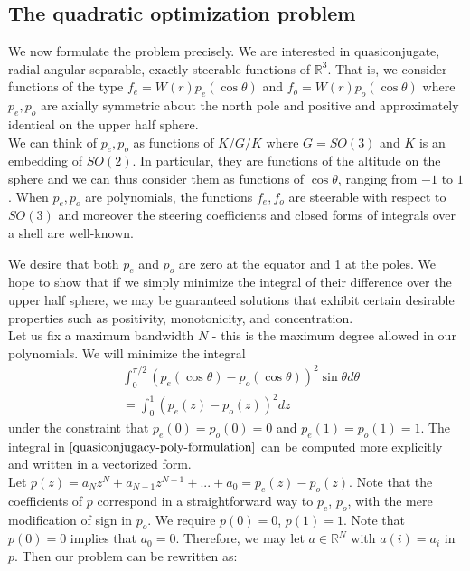 \documentclass{article}
\theoremstyle{definition}
\theoremstyle{remark}
\numberwithin{equation}{section}
\begin{document}
\subsection{The quadratic optimization problem}
\label{problem}

We now formulate the problem precisely. We are interested in quasiconjugate, radial-angular separable, exactly steerable functions of $\mathbb{R}^3$. That is, we consider functions of the type $f_e = W(r)p_e(\cos \theta)$ and $f_o = W(r)p_o(\cos \theta)$ where $p_e, p_o$ are axially symmetric about the north pole and positive and approximately identical on the upper half sphere. \\

We can think of $p_e, p_o$ as functions of $K/G/K$ where $G=SO(3)$ and $K$ is an embedding of $SO(2)$. In particular, they are functions of the altitude on the sphere and we can thus consider them as functions of $\cos \theta$, ranging from $-1$ to $1$. When $p_e, p_o$ are polynomials, the functions $f_e, f_o$ are steerable with respect to $SO(3)$ and moreover the steering coefficients and closed forms of integrals over a shell are well-known. 

We desire that both $p_e$ and $p_o$ are zero at the equator and 1 at the poles. We hope to show that if we simply minimize the integral of their difference over the upper half sphere, we may be guaranteed solutions that exhibit certain desirable properties such as positivity, monotonicity, and concentration. \\

Let us fix a maximum bandwidth $N$ - this is the maximum degree allowed in our polynomials. We will minimize the integral
\begin{align}
&\int_0^{\pi/2} (p_e(\cos\theta) - p_o(\cos\theta))^2 \sin\theta d\theta\\ \label{quasiconjugacy-poly-formulation}
&= \int_0^1 (p_e(z) - p_o(z))^2 dz
\end{align}
under the constraint that $p_e(0)=p_o(0) = 0$ and $p_e(1) = p_o(1) = 1$. The integral in $\ref{quasiconjugacy-poly-formulation}$ can be computed more explicitly and written in a vectorized form. \\
Let $p(z) = a_Nz^N + a_{N-1}z^{N-1} + ... + a_0 = p_e(z) - p_o(z)$. Note that the coefficients of $p$ correspond in a straightforward way to $p_e$, $p_o$, with the mere modification of sign in $p_o$. We require $p(0) = 0$, $p(1) = 1$. Note that $p(0)=0$ implies that $a_0 = 0$. Therefore, we may let  $a\in \mathbb{R}^N$ with $a(i) = a_i$ in $p$. Then our problem can be rewritten as: 
\end{document}
